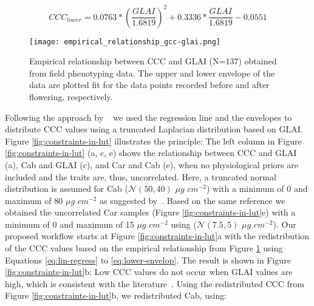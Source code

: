 \begin{equation}
\label{eq:lower-envelop}
    CCC_{lower} = 0.0763 * \left(\frac{GLAI}{1.6819}\right)^2 + 0.3336 * \frac{GLAI}{1.6819} - 0.0551
\end{equation}

\begin{figure}[H]
    \centering
    \texttt{[image: empirical\_relationship\_gcc-glai.png]}
    \caption[Empirical relationship between \gls{CCC} and \gls{GLAI} (N=137) obtained from field phenotyping data. The upper and lower envelope of the data are plotted fit for the data points recorded before and after flowering, respectively.]{Empirical relationship between \gls{CCC} and \gls{GLAI} (N=137) obtained from field phenotyping data. The upper and lower envelope of the data are plotted fit for the data points recorded before and after flowering, respectively.}
    \label{fig:lai-ccc-relationship}
\end{figure}

Following the approach by ~\cite{wocher_rtm-based_2020} we used the regression line and the envelopes to distribute \gls{CCC} values using a truncated Laplacian distribution based on GLAI. Figure \ref{fig:constraints-in-lut} illustrates the principle: The left column in Figure \ref{fig:constraints-in-lut} (a, c, e) shows the relationship between \gls{CCC} and \gls{GLAI} (a), \gls{Cab} and \gls{GLAI} (c), and Car and \gls{Cab} (e), when no physiological priors are included and the traits are, thus, uncorrelated. Here, a truncated normal distribution is assumed for \gls{Cab} ($\mathscr{N} (50,40)$ $\mu g$ $cm^{-2}$) with a minimum of 0 and maximum of 80 $\mu g$ $cm^{-2}$ as suggested by~\cite{danner_efficient_2021}. Based on the same reference we obtained the uncorrelated Car samples (Figure \ref{fig:constraints-in-lut}e) with a minimum of 0 and maximum of 15 $\mu g$ $cm^{-2}$ using ($\mathscr{N} (7.5,5)$ $\mu g$ $cm^{-2}$). Our proposed workflow starts at Figure \ref{fig:constraints-in-lut}a with the redistribution of the \gls{CCC} values based on the empirical relationship from Figure \ref{fig:lai-ccc-relationship} using Equations \ref{eq:lin-regress} to \ref{eq:lower-envelop}. The result is shown in Figure \ref{fig:constraints-in-lut}b: Low \gls{CCC} values do not occur when \gls{GLAI} values are high, which is consistent with the literature~\citep{gitelson_relationships_2014}. Using the redistributed \gls{CCC} from Figure \ref{fig:constraints-in-lut}b, we redistributed Cab, using:

